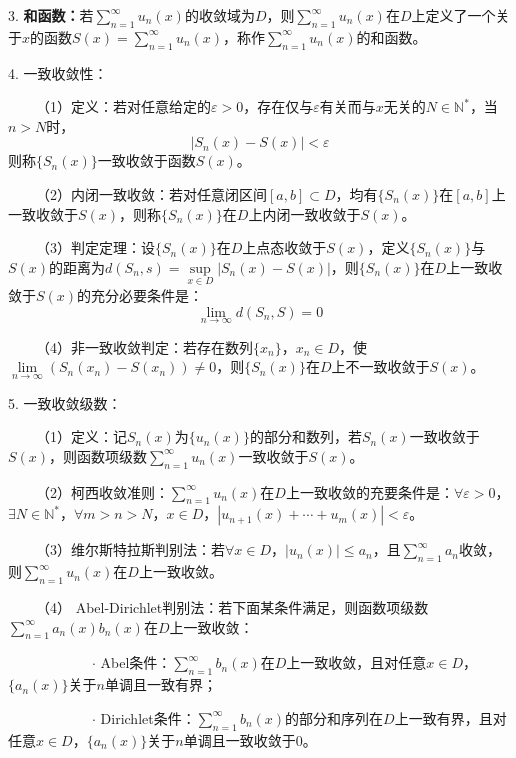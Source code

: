 3. \textbf{和函数：}若$\sum\limits_{n=1}^{\infty} u_n(x)$的收敛域为$D$，则$\sum\limits_{n=1}^{\infty} u_n(x)$在$D$上定义了一个关于$x$的函数$S(x)=\sum\limits_{n=1}^{\infty} u_n(x)$，称作$\sum\limits_{n=1}^{\infty} u_n(x)$的和函数。

4. 一致收敛性：

~~~~（1）定义：若对任意给定的$\varepsilon>0$，存在仅与$\varepsilon$有关而与$x$无关的$N\in \mathbb{N}^*$，当$n>N$时，
\begin{equation*}
    \left|S_n(x)-S(x)\right|<\varepsilon
\end{equation*}
则称$\{S_n(x)\}$一致收敛于函数$S(x)$。

~~~~（2）内闭一致收敛：若对任意闭区间$[a,b]\subset D$，均有$\{S_n(x)\}$在$[a,b]$上一致收敛于$S(x)$，则称$\{S_n(x)\}$在$D$上内闭一致收敛于$S(x)$。

~~~~（3）判定定理：设$\{S_n(x)\}$在$D$上点态收敛于$S(x)$，定义$\{S_n(x)\}$与$S(x)$的距离为$d(S_n,s)=\sup\limits_{x\in D} \left|S_n(x)-S(x)\right|$，则$\{S_n(x)\}$在$D$上一致收敛于$S(x)$的充分必要条件是：
\begin{equation*}
    \lim\limits_{n\rightarrow\infty}d(S_n,S)=0
\end{equation*}

~~~~（4）非一致收敛判定：若存在数列$\{x_n\}$，$x_n\in D$，使$\lim\limits_{n\rightarrow\infty}\left(S_n(x_n)-S(x_n)\right)\neq 0$，则$\{S_n(x)\}$在$D$上不一致收敛于$S(x)$。

5. 一致收敛级数：

~~~~（1）定义：记$S_n(x)$为$\{u_n(x)\}$的部分和数列，若$S_n(x)$一致收敛于$S(x)$，则函数项级数$\sum\limits_{n=1}^{\infty} u_n(x)$一致收敛于$S(x)$。

~~~~（2）柯西收敛准则：$\sum\limits_{n=1}^{\infty} u_n(x)$在$D$上一致收敛的充要条件是：$\forall \varepsilon>0$，$\exists N \in  \mathbb{N}^*$，$\forall m>n>N$，$x\in D$，$\left|u_{n+1}(x)+\cdots+u_m(x)\right|<\varepsilon$。

~~~~（3）维尔斯特拉斯判别法：若$\forall x\in D$，$\left|u_n(x)\right|\leqslant a_n$，且$\sum\limits_{n=1}^{\infty} a_n$收敛，则$\sum\limits_{n=1}^{\infty} u_n(x)$在$D$上一致收敛。

~~~~（4） Abel-Dirichlet判别法：若下面某条件满足，则函数项级数$\sum\limits_{n=1}^\infty a_n(x)b_n(x)$在$D$上一致收敛：

~~~~~~~~~~~~$\cdot$ Abel条件：$\sum\limits_{n=1}^\infty b_n(x)$在$D$上一致收敛，且对任意$x\in D$，$\{a_n(x)\}$关于$n$单调且一致有界；

~~~~~~~~~~~~$\cdot$ Dirichlet条件：$\sum\limits_{n=1}^\infty b_n(x)$的部分和序列在$D$上一致有界，且对任意$x \in D$，$\{a_n(x)\}$关于$n$单调且一致收敛于$0$。

